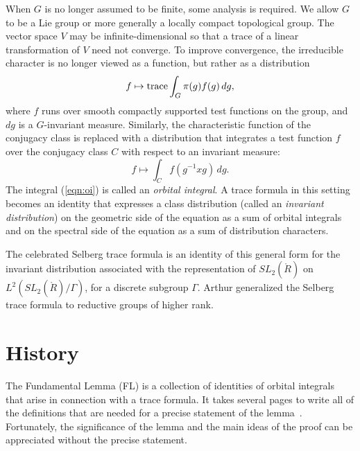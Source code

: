 When $G$ is no longer assumed to be finite, some analysis is
required.  We allow $G$ to be a Lie group or more generally a locally
compact topological group.  The vector space $V$ may be 
infinite-dimensional so that a  trace of a linear
transformation of $V$ need not converge.  To improve convergence,
the irreducible character is no longer viewed as a function, but rather as a
distribution
\[
f \mapsto {\operatorname{trace}} \int_{G} \pi(g) f(g) \, dg,
\]
where $f$ runs over smooth compactly supported test functions on
the group, and $dg$ is a $G$-invariant measure.  Similarly, the
characteristic function of the conjugacy class is replaced with a
distribution that integrates a test function $f$ over the
conjugacy class $C$ with respect to an invariant measure:
\begin{equation}\label{eqn:oi}
f \mapsto \int_C f(g^{-1} x g) \, dg.
\end{equation}
The integral (\ref{eqn:oi}) is called an {\it orbital integral}.  A
trace formula in this setting becomes an identity that expresses a
class distribution (called an {\it invariant distribution}) on the
geometric side of the equation as a sum of orbital integrals and on
the spectral side of the equation as a sum of distribution characters.

The celebrated Selberg trace formula is an identity of this general
form for the invariant distribution associated with the representation
of $SL_2(\ring{R})$ on $L^2(SL_2(\ring{R})/\Gamma)$, for a discrete
subgroup $\Gamma$.  Arthur generalized the Selberg trace formula to
reductive groups of higher rank.


\section{History}

The Fundamental Lemma (FL) is a collection of identities of orbital
integrals that arise in connection with a trace formula.  It takes
several pages to write all of the definitions that are needed for a precise
statement of the lemma~\cite{Hales:FL-statement}.  Fortunately, the
significance of the lemma and the main ideas of the proof can be
appreciated without the precise statement.

